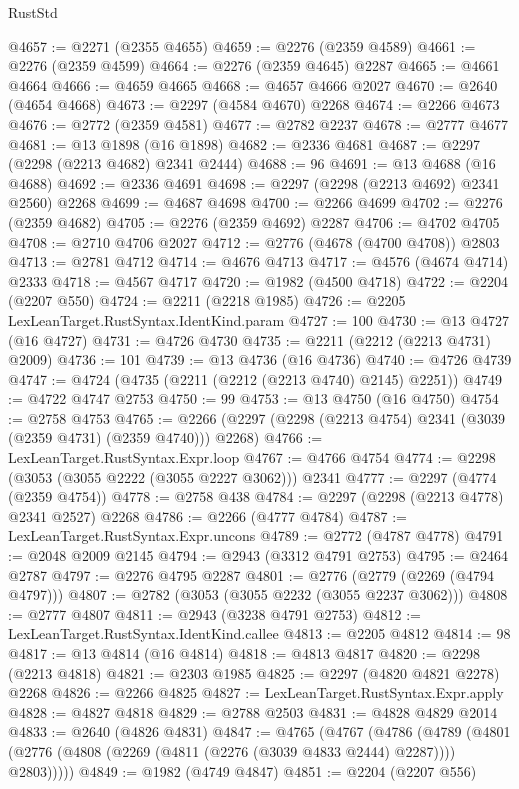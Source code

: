\begin{lexlean}{RustStd}
\begin{coremodule}
{\begin{coremodule}
{{{{{{{{{{{{{{{{{{{{{{{{{{{{{{{{{{{{{{{{{{{{{{{{{{{{{{@4657 := @2271 (@2355 @4655)
@4659 := @2276 (@2359 @4589)
@4661 := @2276 (@2359 @4599)
@4664 := @2276 (@2359 @4645) @2287
@4665 := @4661 @4664
@4666 := @4659 @4665
@4668 := @4657 @4666 @2027
@4670 := @2640 (@4654 @4668)
@4673 := @2297 (@4584 @4670) @2268
@4674 := @2266 @4673
@4676 := @2772 (@2359 @4581)
@4677 := @2782 @2237
@4678 := @2777 @4677
@4681 := @13 @1898 (@16 @1898)
@4682 := @2336 @4681
@4687 := @2297 (@2298 (@2213 @4682) @2341 @2444)
@4688 := 96
@4691 := @13 @4688 (@16 @4688)
@4692 := @2336 @4691
@4698 := @2297 (@2298 (@2213 @4692) @2341 @2560) @2268
@4699 := @4687 @4698
@4700 := @2266 @4699
@4702 := @2276 (@2359 @4682)
@4705 := @2276 (@2359 @4692) @2287
@4706 := @4702 @4705
@4708 := @2710 @4706 @2027
@4712 := @2776 (@4678 (@4700 @4708)) @2803
@4713 := @2781 @4712
@4714 := @4676 @4713
@4717 := @4576 (@4674 @4714) @2333
@4718 := @4567 @4717
@4720 := @1982 (@4500 @4718)
@4722 := @2204 (@2207 @550)
@4724 := @2211 (@2218 @1985)
@4726 := @2205 LexLeanTarget.RustSyntax.IdentKind.param
@4727 := 100
@4730 := @13 @4727 (@16 @4727)
@4731 := @4726 @4730
@4735 := @2211 (@2212 (@2213 @4731) @2009)
@4736 := 101
@4739 := @13 @4736 (@16 @4736)
@4740 := @4726 @4739
@4747 := @4724 (@4735 (@2211 (@2212 (@2213 @4740) @2145) @2251))
@4749 := @4722 @4747 @2753
@4750 := 99
@4753 := @13 @4750 (@16 @4750)
@4754 := @2758 @4753
@4765 := @2266 (@2297 (@2298 (@2213 @4754) @2341 (@3039 (@2359 @4731) (@2359 @4740))) @2268)
@4766 := LexLeanTarget.RustSyntax.Expr.loop
@4767 := @4766 @4754
@4774 := @2298 (@3053 (@3055 @2222 (@3055 @2227 @3062))) @2341
@4777 := @2297 (@4774 (@2359 @4754))
@4778 := @2758 @438
@4784 := @2297 (@2298 (@2213 @4778) @2341 @2527) @2268
@4786 := @2266 (@4777 @4784)
@4787 := LexLeanTarget.RustSyntax.Expr.uncons
@4789 := @2772 (@4787 @4778)
@4791 := @2048 @2009 @2145
@4794 := @2943 (@3312 @4791 @2753)
@4795 := @2464 @2787
@4797 := @2276 @4795 @2287
@4801 := @2776 (@2779 (@2269 (@4794 @4797)))
@4807 := @2782 (@3053 (@3055 @2232 (@3055 @2237 @3062)))
@4808 := @2777 @4807
@4811 := @2943 (@3238 @4791 @2753)
@4812 := LexLeanTarget.RustSyntax.IdentKind.callee
@4813 := @2205 @4812
@4814 := 98
@4817 := @13 @4814 (@16 @4814)
@4818 := @4813 @4817
@4820 := @2298 (@2213 @4818)
@4821 := @2303 @1985
@4825 := @2297 (@4820 @4821 @2278) @2268
@4826 := @2266 @4825
@4827 := LexLeanTarget.RustSyntax.Expr.apply
@4828 := @4827 @4818
@4829 := @2788 @2503
@4831 := @4828 @4829 @2014
@4833 := @2640 (@4826 @4831)
@4847 := @4765
    (@4767
      (@4786
        (@4789 (@4801 (@2776 (@4808 (@2269 (@4811 (@2276 (@3039 @4833 @2444) @2287)))) @2803)))))
@4849 := @1982 (@4749 @4847)
@4851 := @2204 (@2207 @556)
}}}}}}}}}}}}}}}}}}}}}}}}}}}}}}}}}}}}}}}}}}}}}}}}}}}}}}
\end{coremodule}}
\end{coremodule}
\end{lexlean}

